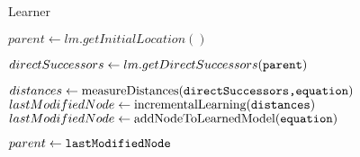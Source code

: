 \begin{algorithm}
	\caption{Learner}
	\label{learner}
	\begin{algorithmic}[1]

			\State $parent \gets lm.getInitialLocation()$
			
			
				\State $directSuccessors \gets lm.getDirectSuccessors(\texttt{parent})$
				
					\State $distances \gets \textrm{measureDistances(\texttt{directSuccessors,equation})}$
					\State $lastModifiedNode \gets \textrm{incrementalLearning(\texttt{distances})}$
				\Else
					\State $lastModifiedNode \gets \textrm{addNodeToLearnedModel(\texttt{equation})}$
				\EndIf
				
				\State $parent \gets \texttt{lastModifiedNode}$
				
			\EndFor
			
		\EndProcedure
	\end{algorithmic}
\end{algorithm}

